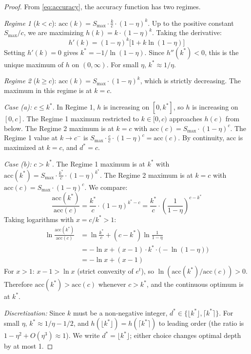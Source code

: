 \documentclass{article}
\theoremstyle{definition}
\theoremstyle{remark}
\newcommand{\depth}{d^*}       %
\newcommand{\noise}{\eta}      %
\newcommand{\acc}{\mathrm{acc}} %
\newcommand{\Smax}{S_{\max}}   %
\begin{document}
\begin{proof}
From \cref{eq:accuracy}, the accuracy function has two regimes.

\emph{Regime 1} ($k < c$): $\acc(k) = \Smax \cdot \frac{k}{c} \cdot (1 - \noise)^k$. Up to the positive constant $\Smax/c$, we are maximizing $h(k) = k \cdot (1 - \noise)^k$. Taking the derivative:
\[
h'(k) = (1-\noise)^k\bigl[1 + k \ln(1-\noise)\bigr]
\]
Setting $h'(k) = 0$ gives $k^* = -1/\ln(1 - \noise)$. Since $h''(k^*) < 0$, this is the unique maximum of $h$ on $(0, \infty)$. For small $\noise$, $k^* \approx 1/\noise$.

\emph{Regime 2} ($k \geq c$): $\acc(k) = \Smax \cdot (1 - \noise)^k$, which is strictly decreasing. The maximum in this regime is at $k = c$.

\emph{Case (a):} $c \leq k^*$. In Regime 1, $h$ is increasing on $[0, k^*]$, so $h$ is increasing on $[0, c]$. The Regime 1 maximum restricted to $k \in [0, c)$ approaches $h(c)$ from below. The Regime 2 maximum is at $k = c$ with $\acc(c) = \Smax \cdot (1-\noise)^c$. The Regime 1 value at $k \to c^-$ is $\Smax \cdot \frac{c}{c} \cdot (1-\noise)^c = \acc(c)$. By continuity, $\acc$ is maximized at $k = c$, and $\depth = c$.

\emph{Case (b):} $c > k^*$. The Regime 1 maximum is at $k^*$ with $\acc(k^*) = \Smax \cdot \frac{k^*}{c} \cdot (1-\noise)^{k^*}$. The Regime 2 maximum is at $k = c$ with $\acc(c) = \Smax \cdot (1-\noise)^c$. We compare:
\[
\frac{\acc(k^*)}{\acc(c)} = \frac{k^*}{c} \cdot (1-\noise)^{k^* - c} = \frac{k^*}{c} \cdot \left(\frac{1}{1-\noise}\right)^{c - k^*}
\]
Taking logarithms with $x = c/k^* > 1$:
\begin{align*}
\ln\frac{\acc(k^*)}{\acc(c)} &= \ln\frac{k^*}{c} + (c - k^*)\ln\frac{1}{1-\noise} \\
&= -\ln x + (x - 1) \cdot k^* \cdot \bigl(-\ln(1-\noise)\bigr) \\
&= -\ln x + (x - 1) \tag{since $k^* = -1/\ln(1-\noise)$}
\end{align*}
For $x > 1$: $x - 1 > \ln x$ (strict convexity of $e^t$), so $\ln(\acc(k^*)/\acc(c)) > 0$. Therefore $\acc(k^*) > \acc(c)$ whenever $c > k^*$, and the continuous optimum is at $k^*$.

\emph{Discretization:} Since $k$ must be a non-negative integer, $\depth \in \{\lfloor k^* \rfloor, \lceil k^* \rceil\}$. For small $\noise$, $k^* \approx 1/\noise - 1/2$, and $h(\lfloor k^* \rfloor) = h(\lceil k^* \rceil)$ to leading order (the ratio is $1 - \noise^2 + O(\noise^3) \approx 1$). We write $\depth = \lfloor k^* \rfloor$; either choice changes optimal depth by at most 1.
\end{proof}
\end{document}
